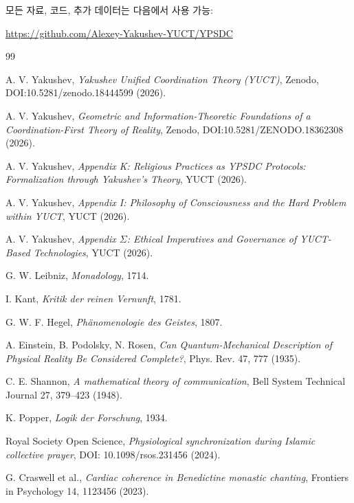 \documentclass[11pt,a4paper]{article}
\begin{document}
	모든 자료, 코드, 추가 데이터는 다음에서 사용 가능:
	\begin{center}
		\url{https://github.com/Alexey-Yakushev-YUCT/YPSDC}
	\end{center}
	
	\begin{thebibliography}{99}
		
		A. V. Yakushev, \emph{Yakushev Unified Coordination Theory (YUCT)}, Zenodo, DOI:10.5281/zenodo.18444599 (2026).
		
		A. V. Yakushev, \emph{Geometric and Information-Theoretic Foundations of a Coordination-First Theory of Reality}, Zenodo, DOI:10.5281/ZENODO.18362308 (2026).
		
		A. V. Yakushev, \emph{Appendix K: Religious Practices as YPSDC Protocols: Formalization through Yakushev's Theory}, YUCT (2026).
		
		A. V. Yakushev, \emph{Appendix I: Philosophy of Consciousness and the Hard Problem within YUCT}, YUCT (2026).
		
		A. V. Yakushev, \emph{Appendix \(\Sigma\): Ethical Imperatives and Governance of YUCT-Based Technologies}, YUCT (2026).
		
		G. W. Leibniz, \emph{Monadology}, 1714.
		
		I. Kant, \emph{Kritik der reinen Vernunft}, 1781.
		
		G. W. F. Hegel, \emph{Phänomenologie des Geistes}, 1807.
		
		A. Einstein, B. Podolsky, N. Rosen, \emph{Can Quantum-Mechanical Description of Physical Reality Be Considered Complete?}, Phys. Rev. 47, 777 (1935).
		
		C. E. Shannon, \emph{A mathematical theory of communication}, Bell System Technical Journal 27, 379--423 (1948).
		
		K. Popper, \emph{Logik der Forschung}, 1934.
		
		Royal Society Open Science, \emph{Physiological synchronization during Islamic collective prayer}, DOI: 10.1098/rsos.231456 (2024).
		
		G. Craswell et al., \emph{Cardiac coherence in Benedictine monastic chanting}, Frontiers in Psychology 14, 1123456 (2023).
		

\end{thebibliography}
\end{document}

